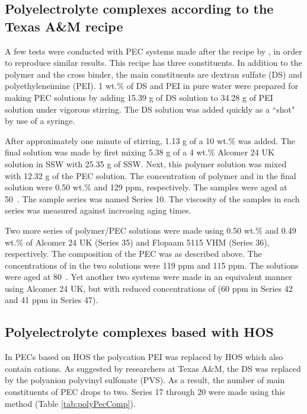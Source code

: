 \documentclass[nanomaterials,article,submit,moreauthors,pdftex]{Definitions/mdpi}
\begin{document}
\subsection{Polyelectrolyte complexes according to the Texas A\&M recipe \citep{Johnson2010}\label{sec:PEC}}
A few tests were conducted with PEC systems made after the recipe by \citet{Johnson2010}, in order to reproduce similar results. This recipe has three constituents. In addition to the polymer and the  cross binder, the main constituents are dextran sulfate (DS)  and polyethyleneimine (PEI).
1 wt.\% of DS and PEI in pure water were prepared for making PEC solutions by adding 15.39 g of DS solution to 34.28 g of PEI solution under vigorous stirring. The DS solution was added quickly as a ``shot" by use of a syringe.


 
After approximately one minute of stirring, 1.13 g of a 10 wt.\%  was added. The final solution was made by first mixing 5.38 g of a 4 wt.\% Alcomer 24 UK solution in SSW with 25.35 g of SSW. Next, this polymer solution was mixed with 12.32 g of the PEC solution. The concentration of polymer and  in the final solution were 0.50 wt.\% and 129 ppm, respectively. The samples were aged at 50~\celsius. The sample series was named Series 10. The viscosity of the samples in each series was measured against increasing aging times. 

Two more series of polymer/PEC solutions were made using 0.50 wt.\% and 0.49 wt.\% of Alcomer 24 UK (Series 35) and Flopaam 5115 VHM (Series 36), respectively. The composition of the PEC was as described above. The concentrations of  in the two solutions were 119 ppm and 115 ppm. The solutions were aged at 80~\celsius. Yet another two systems were made in an equivalent manner using Alcomer 24 UK, but with reduced concentrations of  (60 ppm in Series 42 and 41 ppm in Series 47).

\subsection{Polyelectrolyte complexes based with HOS}
In PECs based on HOS the polycation PEI was replaced by HOS which also contain cations. As suggested by researchers at Texas A\&M, the DS was replaced by the polyanion polyvinyl sulfonate (PVS). As a result, the number of main constituents of PEC drops to two. Series 17 through 20 were made using this method (Table \ref{tab:polyPecComp}). 
\end{document}
